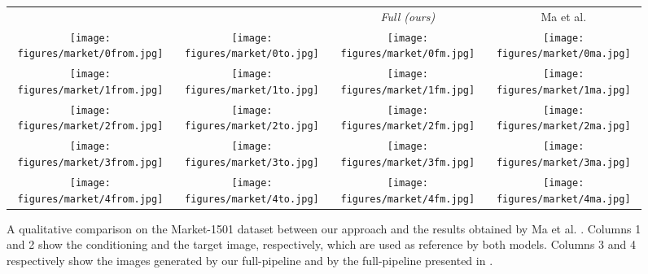 \documentclass[10pt,twocolumn,letterpaper]{article}
\begin{document}
\begin{figure*}[h]
  \centering
  \setlength\tabcolsep{1.0pt}
\begin{tabular}{cccc}
 &  & \small\emph{Full (ours)}& Ma et al. \cite{ma2017pose}\\ 
\texttt{[image: figures/market/0from.jpg]}
&\texttt{[image: figures/market/0to.jpg]}
&\texttt{[image: figures/market/0fm.jpg]}
&\texttt{[image: figures/market/0ma.jpg]}
\\
\texttt{[image: figures/market/1from.jpg]}
&\texttt{[image: figures/market/1to.jpg]}
&\texttt{[image: figures/market/1fm.jpg]}
&\texttt{[image: figures/market/1ma.jpg]}
\\
\texttt{[image: figures/market/2from.jpg]}
&\texttt{[image: figures/market/2to.jpg]}
&\texttt{[image: figures/market/2fm.jpg]}
&\texttt{[image: figures/market/2ma.jpg]}
\\
\texttt{[image: figures/market/3from.jpg]}
&\texttt{[image: figures/market/3to.jpg]}
&\texttt{[image: figures/market/3fm.jpg]}
&\texttt{[image: figures/market/3ma.jpg]}
\\
\texttt{[image: figures/market/4from.jpg]}
&\texttt{[image: figures/market/4to.jpg]}
&\texttt{[image: figures/market/4fm.jpg]}
&\texttt{[image: figures/market/4ma.jpg]}
\end{tabular}
  \caption{A qualitative comparison on the Market-1501 dataset between our approach and the results obtained by Ma et al. \cite{ma2017pose}. Columns 1 and 2  show the conditioning  and the target image, respectively, which are used as reference by both models. Columns 3 and 4 respectively show the images generated by our full-pipeline and by the full-pipeline presented in \cite{ma2017pose}.}
\label{fig:comparison-Market-1}
\end{figure*}
\end{document}
